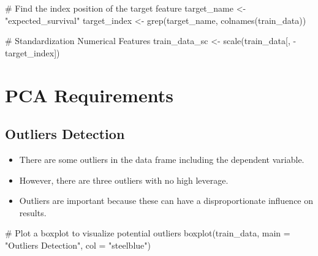 \documentclass[
  letterpaper,
  DIV=11,
  numbers=noendperiod]{scrreprt}
\newenvironment{Shaded}{\begin{snugshade}}{\end{snugshade}}
\newcommand{\AttributeTok}[1]{\textcolor[rgb]{0.40,0.45,0.13}{#1}}
\newcommand{\CommentTok}[1]{\textcolor[rgb]{0.37,0.37,0.37}{#1}}
\newcommand{\FunctionTok}[1]{\textcolor[rgb]{0.28,0.35,0.67}{#1}}
\newcommand{\NormalTok}[1]{\textcolor[rgb]{0.00,0.23,0.31}{#1}}
\newcommand{\OtherTok}[1]{\textcolor[rgb]{0.00,0.23,0.31}{#1}}
\newcommand{\SpecialCharTok}[1]{\textcolor[rgb]{0.37,0.37,0.37}{#1}}
\newcommand{\StringTok}[1]{\textcolor[rgb]{0.13,0.47,0.30}{#1}}
\providecommand{\tightlist}{%
  \setlength{\itemsep}{0pt}\setlength{\parskip}{0pt}}\usepackage{longtable,booktabs,array}
\begin{document}
\begin{Shaded}
\begin{Highlighting}[]
\CommentTok{\# Find the index position of the target feature }
\NormalTok{target\_name }\OtherTok{\textless{}{-}} \StringTok{"expected\_survival"}
\NormalTok{target\_index }\OtherTok{\textless{}{-}} \FunctionTok{grep}\NormalTok{(target\_name, }
                     \FunctionTok{colnames}\NormalTok{(train\_data))}
\end{Highlighting}
\end{Shaded}

\begin{Shaded}
\begin{Highlighting}[]
\CommentTok{\# Standardization Numerical Features}
\NormalTok{train\_data\_sc }\OtherTok{\textless{}{-}} \FunctionTok{scale}\NormalTok{(train\_data[, }\SpecialCharTok{{-}}\NormalTok{target\_index])}
\end{Highlighting}
\end{Shaded}

\hypertarget{pca-requirements}{%
\section{PCA Requirements}\label{pca-requirements}}

\hypertarget{outliers-detection}{%
\subsection{Outliers Detection}\label{outliers-detection}}

\begin{itemize}
\tightlist
\item
  There are some outliers in the data frame including the dependent
  variable.
\item
  However, there are three outliers with no high leverage.
\item
  Outliers are important because these can have a disproportionate
  influence on results.
\end{itemize}

\begin{Shaded}
\begin{Highlighting}[]
\CommentTok{\# Plot a boxplot to visualize potential outliers}
\FunctionTok{boxplot}\NormalTok{(train\_data, }\AttributeTok{main =} \StringTok{"Outliers Detection"}\NormalTok{,}
        \AttributeTok{col =} \StringTok{"steelblue"}\NormalTok{)}
\end{Highlighting}
\end{Shaded}
\end{document}

